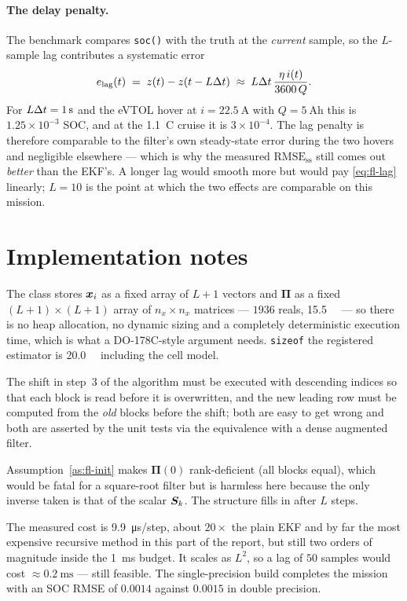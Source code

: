 \paragraph{The delay penalty.}  The benchmark compares \texttt{soc()} with the truth at the
\emph{current} sample, so the $L$-sample lag contributes a systematic error
\begin{equation}
e_\text{lag}(t)\;=\;z(t)-z(t-L\Delta t)\;\approx\;L\Delta t\,\frac{\eta\, i(t)}{3600\,Q}.
\label{eq:fl-lag}
\end{equation}
For $L\Delta t=\SI{1}{\second}$ and the eVTOL hover at $i=\SI{22.5}{\ampere}$ with
$Q=\SI{5}{\ampere\hour}$ this is $1.25\times10^{-3}$ SOC, and at the \SI{1.1}{C} cruise it is
$3\times10^{-4}$.  The lag penalty is therefore comparable to the filter's own steady-state error
during the two hovers and negligible elsewhere --- which is why the measured
$\text{RMSE}_\text{ss}$ still comes out \emph{better} than the EKF's.  A longer lag would smooth
more but would pay \eqref{eq:fl-lag} linearly; $L=10$ is the point at which the two effects are
comparable on this mission.

\section{Implementation notes}
The class stores $\bm{x}_i$ as a fixed array of $L+1$ vectors and $\bm{\Pi}$ as a fixed
$(L+1)\times(L+1)$ array of $n_x\times n_x$ matrices --- $1936$ reals, \SI{15.5}{\kilo\byte} --- so
there is no heap allocation, no dynamic sizing and a completely deterministic execution time, which
is what a DO-178C-style argument needs.  \texttt{sizeof} the registered estimator is
\SI{20.0}{\kilo\byte} including the cell model.

The shift in step~3 of the algorithm must be executed with descending indices so that each block is
read before it is overwritten, and the new leading row must be computed from the \emph{old} blocks
before the shift; both are easy to get wrong and both are asserted by the unit tests via the
equivalence with a dense augmented filter.

Assumption~\ref{as:fl-init} makes $\bm{\Pi}(0)$ rank-deficient (all blocks equal), which would be
fatal for a square-root filter but is harmless here because the only inverse taken is that of the
scalar $\bm{S}_k$.  The structure fills in after $L$ steps.

The measured cost is \SI{9.9}{\micro\second}/step, about $20\times$ the plain EKF and by
far the most expensive recursive method in this part of the report, but still two orders of
magnitude inside the \SI{1}{\milli\second} budget.  It scales as $L^2$, so a lag of $50$ samples
would cost $\approx\SI{0.2}{\milli\second}$ --- still feasible.  The single-precision build
completes the mission with an SOC RMSE of $0.0014$ against $0.0015$ in double precision.

